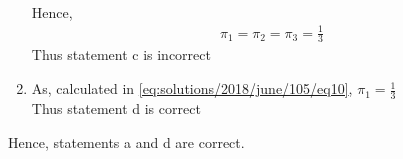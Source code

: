 \begin{enumerate}
{\begin{align}
    \end{align}
    Hence,
    \begin{align}
    \pi_1=\pi_2=\pi_3=\frac{1}{3} \label{eq:solutions/2018/june/105/eq10}
    \end{align}
    Thus statement c is incorrect
    }\\
    \item{As, calculated in \ref{eq:solutions/2018/june/105/eq10}, $\pi_1=\frac{1}{3}$\\
    Thus statement d is correct}
    \end{enumerate}
Hence, statements a and d are correct.
